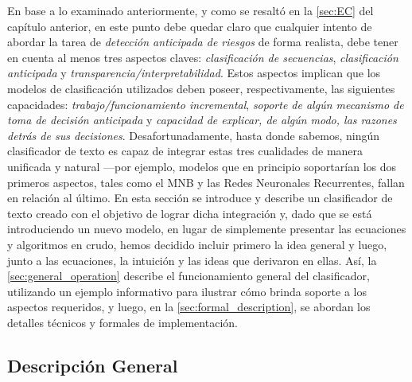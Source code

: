 
En base a lo examinado anteriormente, y como se resaltó en la \autoref{sec:EC} del capítulo anterior, en este punto debe quedar claro que cualquier intento de abordar la tarea de \emph{detección anticipada de riesgos} de forma realista, debe tener en cuenta al menos tres aspectos claves: \emph{clasificación de secuencias}, \emph{clasificación anticipada} y \emph{transparencia/interpretabilidad}.
Estos aspectos implican que los modelos de clasificación utilizados deben poseer, respectivamente, las siguientes capacidades: \emph{trabajo/funcionamiento incremental}, \emph{soporte de algún mecanismo de toma de decisión anticipada} y \emph{capacidad de explicar, de algún modo, las razones detrás de sus decisiones}.
Desafortunadamente, hasta donde sabemos, ningún clasificador de texto es capaz de integrar estas tres cualidades de manera unificada y natural ---por ejemplo, modelos que en principio soportarían los dos primeros aspectos, tales como el \ac{MNB} y las Redes Neuronales Recurrentes, fallan en relación al último.
En esta sección se introduce y describe un clasificador de texto creado con el objetivo de lograr dicha integración y, dado que se está introduciendo un nuevo modelo, en lugar de simplemente presentar las ecuaciones y algoritmos en crudo, hemos decidido incluir primero la idea general y luego, junto a las ecuaciones, la intuición y las ideas que derivaron en ellas.
Así, la \autoref{sec:general_operation} describe el funcionamiento general del clasificador, utilizando un ejemplo informativo para ilustrar cómo brinda soporte a los aspectos requeridos, y luego, en la \autoref{sec:formal_description}, se abordan los detalles técnicos y formales de implementación.

\subsection{Descripción General}
\label{sec:general_operation}

